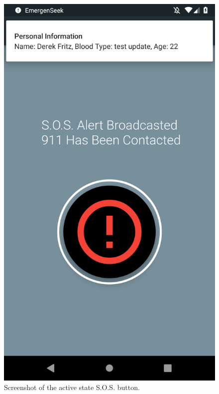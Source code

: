 \documentclass[10pt, a4paper]{article}
\begin{document}
\begin{figure}[H]
  \includegraphics[width=\linewidth]{final-diagrams/Emulator-Screenshots/Screenshot_1556126800.png}
  \caption{Screenshot of the active state S.O.S. button.}
\endminipage\hfill
{}%

\end{figure}
\end{document}
